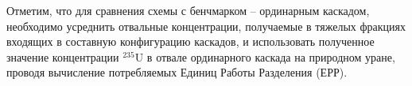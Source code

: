 Отметим, что для сравнения схемы с бенчмарком -- ординарным каскадом, необходимо усреднить отвальные концентрации, получаемые в тяжелых фракциях входящих в составную конфигурацию каскадов, и использовать полученное значение концентрации $^{235}$U в отвале ординарного каскада на природном уране, проводя вычисление потребляемых Единиц Работы Разделения (ЕРР).









